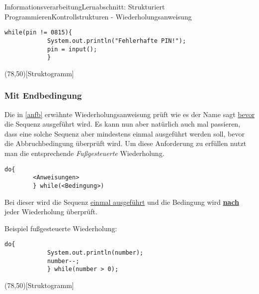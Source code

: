 \documentclass[11pt,oneside,openany,headings=optiontotoc,11pt,numbers=noenddot]{article}
\begin{document}
\begin{worksheet}{Informationsverarbeitung}{Lernabschnitt: Strukturiert Programmieren}{Kontrollstrukturen - Wiederholungsanweisung}
\begin{minipage}[t]{0.48\textwidth}
\begin{lstlisting}[style=JavaInputStyle,frame=single]
			while(pin != 0815){
			System.out.println("Fehlerhafte PIN!");
			pin = input();
			}
			\end{lstlisting}
		\end{minipage}
		\hfill
		\begin{minipage}[t]{0.48\textwidth}
			\vspace*{0pt}
			\begin{struktogramm}(78,50)[Struktogramm]
				\whileend
			\end{struktogramm}
		\end{minipage}
		\subsubsection{Mit Endbedingung}
		Die in \ref{anfb} erwähnte Wiederholungsanweisung prüft wie es der Name sagt \underline{bevor} die Sequenz ausgeführt wird. Es kann nun aber natürlich auch mal passieren, dass eine solche Sequenz aber mindestens einmal ausgeführt werden soll, bevor die Abbruchbedingung überprüft wird. Um diese Anforderung zu erfüllen nutzt man die entsprechende \textit{Fußgesteuerte} Wiederholung.\\
		\begin{lstlisting}[style=JavaInputStyle]
		do{
		<Anweisungen>
		} while(<Bedingung>)
		\end{lstlisting}
		\par\noindent
		Bei dieser wird die Sequenz \underline{einmal ausgeführt} und die Bedingung wird \textbf{\underline{nach}} jeder Wiederholung überprüft.\\
		\par\noindent
		\begin{minipage}[t]{0.48\textwidth}
			\vspace*{0pt}
			Beispiel fußgesteuerte Wiederholung:
			\begin{lstlisting}[style=JavaInputStyle,frame=single]
			do{
			System.out.println(number);
			number--;
			} while(number > 0);
			\end{lstlisting}
		\end{minipage}
		\hfill
		\begin{minipage}[t]{0.48\textwidth}
			\vspace*{0pt}
			\begin{struktogramm}(78,50)[Struktogramm]
				\untilend
			\end{struktogramm}
		\end{minipage}
	\end{worksheet}
\end{document}
